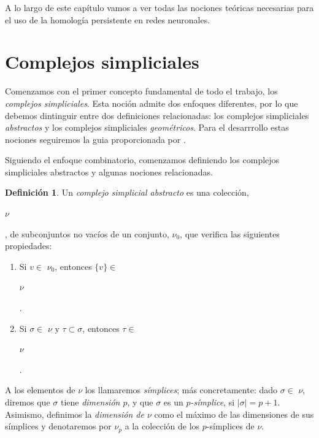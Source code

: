 \documentclass[12pt, a4paper, twoside]{book}
\numberwithin{equation}{section}
\theoremstyle{definition}
\newtheorem{defi}{Definición}[section]
\theoremstyle{remark}
\theoremstyle{plain}
\begin{document}
	A lo largo de este capítulo vamos a ver todas las nociones teóricas 
	necesarias para el uso de la homología persistente en redes neuronales.	
	
	\section{Complejos simpliciales}
	Comenzamos con el primer concepto fundamental de todo el trabajo, los 
	\emph{complejos simpliciales}. Esta noción admite dos enfoques 
	diferentes, por lo que debemos dintinguir entre dos definiciones 
	relacionadas: los complejos simpliciales \emph{abstractos} y los 
	complejos simpliciales \emph{geométricos}. Para el desarrrollo estas 
	nociones seguiremos la guia proporcionada por 
	\cite{TopoAlg-Edelsbrunner,Intro-Otter}.

	Siguiendo el enfoque combinatorio, comenzamos definiendo los complejos 
	simpliciales abstractos y algunas nociones relacionadas. 

	\begin{defi}
	
	Un \textit{complejo simplicial abstracto} es una colección, 
	\begin{Large}$\nu$\end{Large}, de subconjuntos no vacíos de un 
	conjunto, {\Large $\nu$}$_{0}$, que verifica las siguientes 
	propiedades:
	
	\begin{enumerate}
		\item Si $v \in $ {\Large $ \nu$}$_{0}$, entonces $\{v\} \in$
			\begin{Large}$ \nu$\end{Large}.
		\item Si $\sigma \in $ {\Large $ \nu$}$ \text{ y } \tau 
			\subset \sigma$, entonces $ \tau \in $
			\begin{Large}$ \nu$\end{Large}.
	\end{enumerate}
	
	A los elementos de {\Large $\nu$} los llamaremos \textit{símplices};
	más concretamente: dado $\sigma \in $ {\Large $\nu$}, diremos que 
	$\sigma$ tiene \textit{dimensión $p$}, y que $\sigma$ es un 
	\textit{$p$-símplice}, si $|\sigma|=p+1$. Asimismo, definimos la 
	\textit{dimensión de {\Large $\nu$}} como el máximo de las dimensiones 
	de sus símplices y denotaremos por {\Large $\nu$}$_{p}$ a la colección 
	de los $p$-símplices de {\Large $\nu$}.	
	
	\end{defi}
\end{document}
